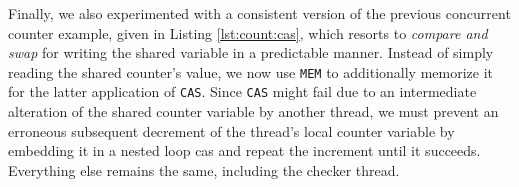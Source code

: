 Finally, we also experimented with a consistent version of the previous concurrent counter example, given in Listing \ref{lst:count:cas}, which resorts to \emph{compare and swap} for writing the shared variable in a predictable manner.
Instead of simply reading the shared counter's value, we now use \lstinline[style=asm]{MEM} to additionally memorize it for the latter application of \lstinline[style=asm]{CAS}.
Since \lstinline[style=asm]{CAS} might fail due to an intermediate alteration of the shared counter variable by another thread, we must prevent an erroneous subsequent decrement of the thread's local counter variable by embedding it in a nested loop {\color{red!60!black}\textsf{cas}}
and repeat the increment until it succeeds. %
Everything else remains the same, including the checker thread.

\vfill


